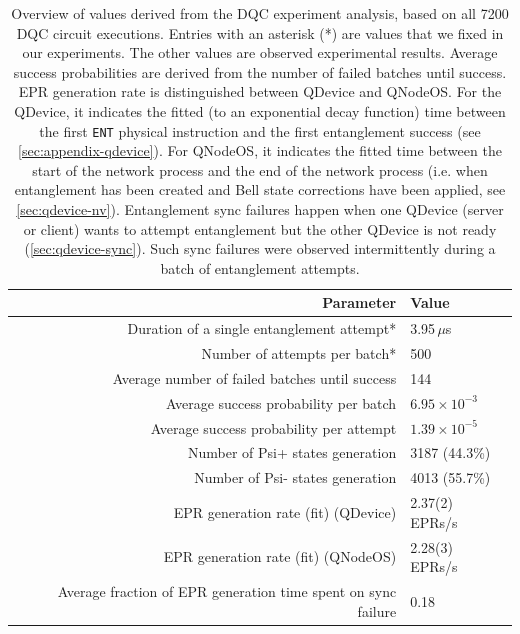 \begin{table}[htpb]
    \centering
    \begin{tabular}{|r|l|}
    \hline
    \textbf{Parameter} & \textbf{Value} \\ 
    \hline
    Duration of a single entanglement attempt* & 3.95\,$\mu$s \\
    Number of attempts per batch* & 500 \\
    Average number of failed batches until success & 144 \\
    Average success probability per batch & $6.95 \times 10^{-3}$ \\
    Average success probability per attempt & $1.39 \times 10^{-5}$ \\
    Number of Psi+ states generation & 3187 (44.3\%) \\
    Number of Psi- states generation & 4013 (55.7\%) \\
    EPR generation rate (fit) (QDevice) & 2.37(2) EPRs/s \\
    EPR generation rate (fit) (QNodeOS) & 2.28(3) EPRs/s \\
    Average fraction of EPR generation time spent on sync failure & 0.18 \\
    
    \hline
    \end{tabular}
    \caption{Overview of values derived from the \ac{DQC} experiment analysis, based on all 7200 \ac{DQC} circuit executions. Entries with an asterisk (*) are values that we fixed in our experiments. The other values are observed experimental results. Average success probabilities are derived from the number of failed batches until success.
    \ac{EPR} generation rate is distinguished between \ac{QDevice} and \ac{QNodeOS}. For the \ac{QDevice}, it indicates the fitted (to an exponential decay function) time between the first \texttt{ENT} physical instruction and the first entanglement success (see \cref{sec:appendix-qdevice}). For \ac{QNodeOS}, it indicates the fitted time between the start of the network process and the end of the network process (i.e. when entanglement has been created and Bell state corrections have been applied, see \cref{sec:qdevice-nv}). Entanglement sync failures happen when one \ac{QDevice} (server or client) wants to attempt entanglement but the other \ac{QDevice} is not ready (\cref{sec:qdevice-sync}). Such sync failures were observed intermittently during a batch of entanglement attempts.}
    \label{tab:entanglement_stats}
\end{table}

